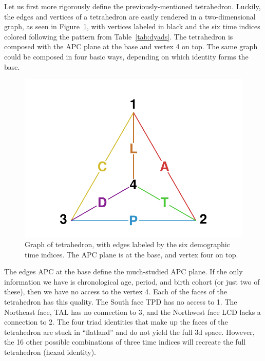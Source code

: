 \documentclass[12pt,oneside,a4paper]{article} %
\begin{document}
Let us first more rigorously define the previously-mentioned tetrahedron.
Luckily, the edges and vertices of a tetrahedron are easily rendered in a
two-dimensional graph, as seen in Figure~\ref{fig:tet}, with vertices labeled
in black and the six time indices colored following the pattern from
Table~\ref{tab:dyads}. The tetrahedron is composed with the APC plane at the
base and vertex 4 on top. The same graph could be composed in four basic
ways, depending on which identity forms the base.

\begin{figure}[h!]
\centering
\caption{Graph of tetrahedron, with edges labeled by the six demographic time
indices. The APC plane is at the base, and vertex four on top.}
\label{fig:tet}
\includegraphics[scale=.8]{Figures/TetraHedronVerticesEdges.pdf}
\end{figure}

The edges APC at the base define the much-studied APC plane. If the only
information we have is chronological age, period, and birth cohort (or just two
of these), then we have no access to the vertex 4. Each of the faces of the
tetrahedron has this quality. The South face TPD has no access to 1.
The Northeast face, TAL has no connection to 3, and the Northwest face
LCD lacks a connection to 2. The four triad identities that make up the faces of
the tetrahedron are stuck in ``flatland'' and do not yield the full 3d
space. However, the 16 other possible combinations of three time indices will
recreate the full tetrahedron (hexad identity).
\end{document}
